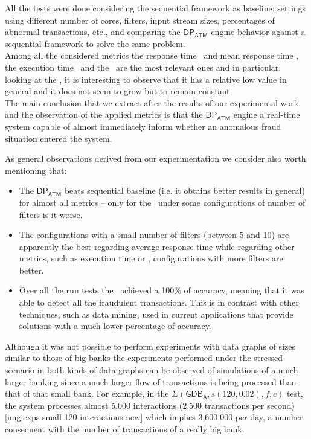 All the tests were done considering the sequential framework as baseline: settings using different number of cores, 
filters, input stream sizes, percentages of abnormal transactions, etc., and comparing the $\mathsf{DP_{ATM}}$ 
engine behavior against a sequential framework to solve the same problem.\\

Among all the considered metrics the response time \RT\ and mean response time \MRT, the execution time \ET\ and the \dieft\ 
are the most relevant ones and in particular, looking at the \MRT, it is interesting to observe that it has a relative low value 
in general and it does not seem to grow but to remain constant.\\

The main conclusion that we extract after the results of our experimental work and the observation of the applied metrics 
is that the $\mathsf{DP_{ATM}}$ engine a real-time system capable of almost immediately inform whether an anomalous fraud situation entered the system.

As general observations derived from our experimentation we consider also worth mentioning that: 
\begin{itemize}
\item The $\mathsf{DP_{ATM}}$ beats sequential baseline (i.e. it obtains better results in general) for almost all metrics -- only for the \MRT\  
under some configurations of number of filters is it worse. 
\item The configurations with a small number of filters (between 5 and 10) are apparently 
the best regarding average response time while regarding other metrics, such as execution time or \dieft, 
configurations with more filters are better. 
\item Over all the run tests the \DPATM\ achieved a 100\% of accuracy, meaning that it was able to detect all the fraudulent transactions. This is in contrast with other techniques, such as data mining, used in current applications that provide solutions with a much lower percentage of accuracy.
\end{itemize}

Although it was not possible to perform experiments with data graphs of sizes similar to those of big banks the experiments performed under 
the stressed scenario in both kinds of data graphs can be observed of simulations of a much larger banking  since a much larger flow of 
transactions is being processed than that of that small bank.  For example, in the $\Sigma(\mathsf{GDB_A}, s(120, 0.02), f, c)$ test, 
the system processes almost 5,000 interactions (2,500 transactions per second) \ref{img:exps-small-120-interactions-new} which implies 3,600,000 per day, a number consequent with the number of transactions of a really big bank.\\

